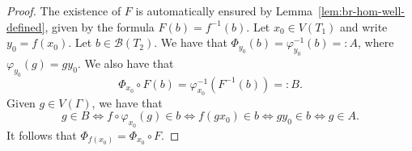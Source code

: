 \documentclass[11pt,a4paper]{amsart}
\newtheorem{lemma}[theorem]{Lemma}
\theoremstyle{definition}
\newcommand{\per}{\mathcal{H}}
\newcommand{\br}{{\mathscr{B}}}
\begin{document}
\begin{proof}
    The existence of $F$ is automatically ensured by Lemma~\ref{lem:br-hom-well-defined}, given by the formula
    $
    F(b) = f^{-1}(b)
    $. 
    Let $x_0 \in V(T_1)$ and write $y_0 = f(x_0)$. 
    Let $b \in \br(T_2)$. We have that $\Phi_{y_0}(b) = \varphi_{y_0}^{-1}(b) =: A$, where $\varphi_{y_0}(g) = gy_0$.
    We also have that 
    $$
    \Phi_{x_0} \circ F(b) = \varphi^{-1}_{x_0}(F^{-1}(b)) =: B.
    $$
    Given $g \in V(\Gamma)$, we have that
    $$
    g \in B \Longleftrightarrow f \circ \varphi_{x_0}(g) \in b \Longleftrightarrow f(gx_0) \in b \Longleftrightarrow g y_0 \in b \Longleftrightarrow g \in A.
    $$
    It follows that $\Phi_{f(x_0)} = \Phi_{x_0} \circ F$. 
\end{proof}



    




\end{document}
